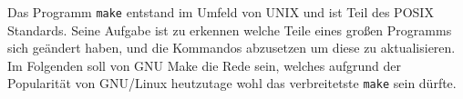 Das Programm \texttt{make} entstand im Umfeld von UNIX und ist Teil des POSIX
Standards.  Seine Aufgabe ist zu erkennen welche Teile eines großen Programms
sich geändert haben, und die Kommandos abzusetzen um diese zu aktualisieren.
%
Im Folgenden soll von GNU Make die Rede sein, welches aufgrund der
Popularität von GNU/Linux heutzutage wohl das verbreitetste \texttt{make}
sein dürfte.
